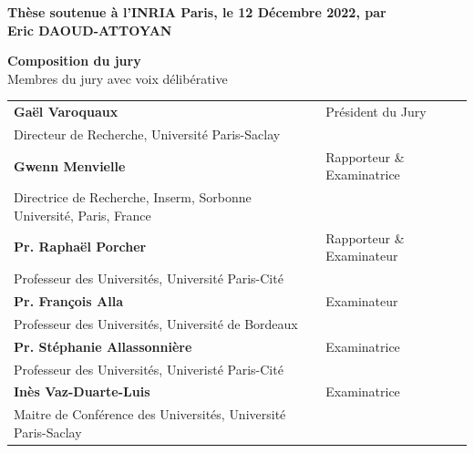 \documentclass[12pt, a4paper]{book}
\begin{document}
\begin{titlepage}
  \textbf{Thèse soutenue à l'INRIA Paris, le 12 Décembre 2022, par}\\
  \bigskip
  \Large {\color{Prune} \textbf{Eric DAOUD-ATTOYAN}} %

  \vspace{\fill} %

  \bigskip

  \flushleft
  \small {\color{Prune} \textbf{Composition du jury}}\\
  {\color{Prune} \scriptsize {Membres du jury avec voix délibérative}} \\
  \vspace{2mm}
  \scriptsize
  \begin{tabular}{|p{7cm}l}
    \arrayrulecolor{Prune}
    \textbf{Gaël Varoquaux}                                             & Président du Jury          \\
    Directeur de Recherche, Université Paris-Saclay                     &                            \\
    \textbf{Gwenn Menvielle}                                            & Rapporteur \& Examinatrice \\
    Directrice de Recherche, Inserm, Sorbonne Université, Paris, France &                            \\
    \textbf{Pr. Raphaël Porcher}                                        & Rapporteur \& Examinateur  \\
    Professeur des Universités, Université Paris-Cité                   &                            \\
    \textbf{Pr. François Alla}                                          & Examinateur                \\
    Professeur des Universités, Université de Bordeaux                  &                            \\
    \textbf{Pr. Stéphanie Allassonnière}                                & Examinatrice               \\
    Professeur des Universités, Univeristé Paris-Cité                   &                            \\
    \textbf{Inès Vaz-Duarte-Luis}                                       & Examinatrice               \\
    Maitre de Conférence des Universités, Université Paris-Saclay       &                            \\
  \end{tabular}

\end{titlepage}
\end{document}
